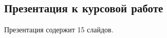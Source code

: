 \begin{appendices}
	\chapter{}
	\section*{Презентация к курсовой работе}
	Презентация содержит 15 слайдов.
\end{appendices}